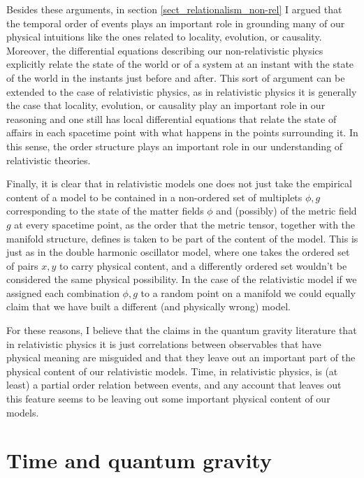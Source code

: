 \documentclass[12 pt]{article}
\begin{document}
Besides these arguments, in section \ref{sect_relationalism_non-rel} I argued that the temporal order of events plays an important role in grounding many of our physical intuitions like the ones related to locality, evolution, or causality. Moreover, the differential equations describing our non-relativistic physics explicitly relate the state of the world or of a system at an instant with the state of the world in the instants just before and after. This sort of argument can be extended to the case of relativistic physics, as in relativistic physics it is generally the case that locality, evolution, or causality play an important role in our reasoning and one still has local differential equations that relate the state of affairs in each spacetime point with what happens in the points surrounding it. In this sense, the order structure plays an important role in our understanding of relativistic theories.

Finally, it is clear that in relativistic models one does not just take the empirical content of a model to be contained in a non-ordered set of multiplets $\phi,g$ corresponding to the state of the matter fields $\phi$ and (possibly) of the metric field $g$ at every spacetime point, as the order that the metric tensor, together with the manifold structure, defines is taken to be part of the content of the model. This is just as in the double harmonic oscillator model, where one takes the ordered set of pairs $x,y$ to carry physical content, and a differently ordered set wouldn't be considered the same physical possibility. In the case of the relativistic model if we assigned each combination $\phi,g$ to a random point on a manifold we could equally claim that we have built a different (and physically wrong) model.

For these reasons, I believe that the claims in the quantum gravity literature that in relativistic physics it is just correlations between observables that have physical meaning are misguided and that they leave out an important part of the physical content of our relativistic models. Time, in relativistic physics, is (at least) a partial order relation between events, and any account that leaves out this feature seems to be leaving out some important physical content of our models.   

\section{Time and quantum gravity} \label{sect_quantum_gravity}
\end{document}
